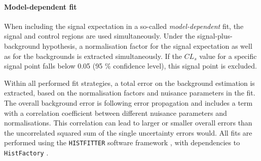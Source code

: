 \paragraph{Model-dependent fit}
When including the signal expectation in a so-called \textit{model-dependent} fit,  the signal and control regions are used simultaneously.  Under the signal-plus-background hypothesis,  a normalisation factor for the signal expectation as well as for the backgrounds is extracted simultaneously.  If the $CL_s$ value for a specific signal point falls below 0.05 (95 \% confidence level),  this signal point is excluded.

Within all performed fit strategies,  a total error on the background estimation is extracted,  based on the normalisation factors and nuisance parameters in the fit.
The overall background error is following error propagation and includes a term with a correlation coefficient between different nuisance parameters and normalisations.  This correlation can lead to larger or smaller overall errors than the uncorrelated squared sum of the single uncertainty errors would.  All fits are performed using the \texttt{HISTFITTER} software framework \cite{HistFitter},  with dependencies to \texttt{HistFactory} \cite{HistFactory}.

